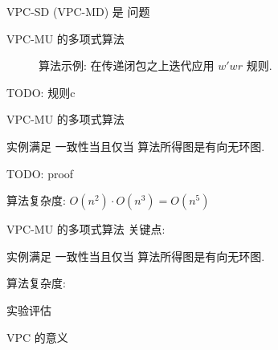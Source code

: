 \begin{frame}{VPC-SD (VPC-MD) 是 \npc{} 问题}
\end{frame}
\begin{frame}{VPC-MU 的多项式算法 \rwclosure{}}
  \begin{figure}[h!]
    \centering
    \begin{adjustbox}{max totalsize = {0.65\textwidth}{1.00\textheight}, center}
	  
    \end{adjustbox}
	\caption{\rwclosure{} 算法示例: 在传递闭包之上迭代应用 $w'wr$ 规则.}
  \end{figure}

  TODO: 规则c
\end{frame}
\begin{frame}{VPC-MU 的多项式算法 \rwclosure{}}
  \begin{ctheorem}
	 实例满足 \pram{} 一致性当且仅当 \rwclosure{} 算法所得图是有向无环图.
  \end{ctheorem}

  \pause 
  TODO: proof

  \pause
  \centerline{\rwclosure{} 算法复杂度: $O(n^2) \cdot O(n^3) = O(n^5)$}
\end{frame}
\begin{frame}{VPC-MU 的多项式算法 \readcentric{}}
  关键点:

  \begin{ctheorem}
	 实例满足 \pram{} 一致性当且仅当 \readcentric{} 算法所得图是有向无环图.
  \end{ctheorem}

  \pause
  \centerline{\rwclosure{} 算法复杂度: }
\end{frame}
\begin{frame}{实验评估}
  
\end{frame}
\begin{frame}{VPC 的意义}
\end{frame}
